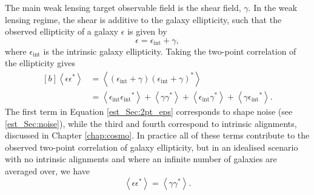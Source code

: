 The main weak lensing target observable field is the shear field, $\gamma$. In the weak lensing regime, the shear is additive to the galaxy ellipticity, such that the observed ellipticity of a galaxy $\epsilon$ is given by
\begin{equation}
\epsilon = \epsilon_\text{int} + \gamma,
\end{equation}
where $\epsilon_\text{int}$ is the intrinsic galaxy ellipticity. Taking the two-point correlation of the ellipticity gives
\begin{equation}
\begin{aligned}[b]
\left\langle \epsilon \epsilon^* \right\rangle &=
\left\langle \left( \epsilon_\text{int} + \gamma \right)
\left( \epsilon_\text{int} + \gamma \right)^* \right\rangle
\\
&= \left\langle \epsilon_\text{int} {\epsilon_\text{int}}^* \right\rangle
+ \left\langle \gamma \gamma^* \right\rangle
+ \left\langle \epsilon_\text{int} \gamma^* \right\rangle
+ \left\langle \gamma {\epsilon_\text{int}}^* \right\rangle.
\end{aligned}
\label{est_Sec:2pt_eps}
\end{equation}
The first term in Equation \eqref{est_Sec:2pt_eps} corresponds to shape noise (see \autoref{est_Sec:noise}), while the third and fourth correspond to intrinsic alignments, discussed in Chapter \ref{chap:cosmo}. In practice all of these terms contribute to the observed two-point correlation of galaxy ellipticity, but in an idealised scenario with no intrinsic alignments and where an infinite number of galaxies are averaged over, we have
\begin{equation}
\left\langle \epsilon \epsilon^* \right\rangle =
\left\langle \gamma \gamma^* \right\rangle.
\end{equation}


